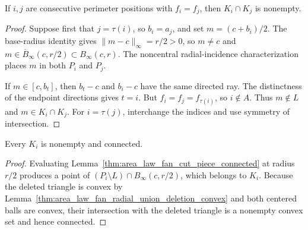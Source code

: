 \begin{lemma}
    \label{thm:area_law_fan_closed_half_intersection}
    \leanok
    If $i,j$ are consecutive perimeter positions with $f_i=f_j$, then
    $K_i\cap K_j$ is nonempty.
\end{lemma}
\begin{proof}
    \leanok
    Suppose first that $j=\tau(i)$, so $b_i=a_j$, and set
    $m=(c+b_i)/2$. The base-radius identity gives
    $\|m-c\|_\infty=r/2>0$, so $m\ne c$ and
    $m\in\overline B_\infty(c,r/2)\subset B_\infty(c,r)$.
    The noncentral radial-incidence characterization places $m$ in
    both $P_i$ and $P_j$.

    If $m\in[c,b_t]$, then $b_t-c$ and $b_i-c$ have the same
    directed ray. The distinctness of the endpoint directions gives
    $t=i$. But $f_i=f_j=f_{\tau(i)}$, so $i\notin A$.
    Thus $m\notin L$ and $m\in K_i\cap K_j$.
    For $i=\tau(j)$, interchange the indices and use symmetry of
    intersection.
\end{proof}

\begin{lemma}
    \label{thm:area_law_fan_closed_half_piece_connected}
    \leanok
    Every $K_i$ is nonempty and connected.
\end{lemma}
\begin{proof}
    \leanok
    Evaluating Lemma~\ref{thm:area_law_fan_cut_piece_connected} at
    radius $r/2$ produces a point of
    $(P_i\setminus L)\cap B_\infty(c,r/2)$, which belongs to
    $K_i$. Because the deleted triangle is convex by
    Lemma~\ref{thm:area_law_fan_radial_union_deletion_convex} and
    both centered balls are convex, their intersection with the
    deleted triangle is a nonempty convex set and hence connected.
\end{proof}

